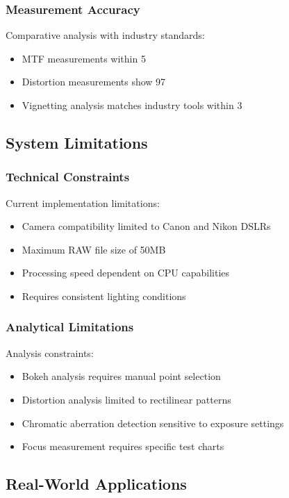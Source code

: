 \subsubsection{Measurement Accuracy}
Comparative analysis with industry standards:
\begin{itemize}
    \item MTF measurements within 5%
    \item Distortion measurements show 97%
    \item Vignetting analysis matches industry tools within 3%
\end{itemize}

\subsection{System Limitations}

\subsubsection{Technical Constraints}
Current implementation limitations:
\begin{itemize}
    \item Camera compatibility limited to Canon and Nikon DSLRs
    \item Maximum RAW file size of 50MB
    \item Processing speed dependent on CPU capabilities
    \item Requires consistent lighting conditions
\end{itemize}

\subsubsection{Analytical Limitations}
Analysis constraints:
\begin{itemize}
    \item Bokeh analysis requires manual point selection
    \item Distortion analysis limited to rectilinear patterns
    \item Chromatic aberration detection sensitive to exposure settings
    \item Focus measurement requires specific test charts
\end{itemize}

\subsection{Real-World Applications}

